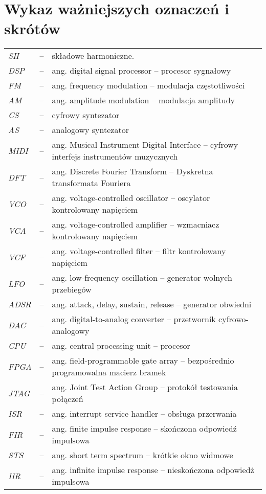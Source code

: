 \chapter*{Wykaz ważniejszych oznaczeń i skrótów}

\begin{tabular}{lcl}
	\textit{SH} & -- & składowe harmoniczne. \\
	\textit{DSP} & -- & ang. digital signal processor -- procesor sygnałowy \\
	\textit{FM} & -- & ang. frequency modulation -- modulacja częstotliwości \\
	\textit{AM} & -- & ang. amplitude modulation -- modulacja amplitudy \\
	\textit{CS} & -- & cyfrowy syntezator \\
	\textit{AS} & -- & analogowy syntezator \\
	\textit{MIDI} & -- & ang. Musical Instrument Digital Interface -- cyfrowy interfejs instrumentów muzycznych \\
	\textit{DFT} & -- & ang. Discrete Fourier Transform -- Dyskretna transformata Fouriera \\
	\textit{VCO} & -- & ang. voltage-controlled oscillator -- oscylator kontrolowany napięciem \\
	\textit{VCA} & -- & ang. voltage-controlled amplifier -- wzmacniacz kontrolowany napięciem \\
	\textit{VCF} & -- & ang. voltage-controlled filter -- filtr kontrolowany napięciem \\
	\textit{LFO} & -- & ang. low-frequency oscillation -- generator wolnych przebiegów \\
	\textit{ADSR} & -- & ang. attack, delay, sustain, release -- generator obwiedni \\
	\textit{DAC} & -- & ang. digital-to-analog converter -- przetwornik cyfrowo-analogowy \\
	\textit{CPU} & -- & ang. central processing unit -- procesor \\
	\textit{FPGA} & -- & ang. field-programmable gate array -- bezpośrednio programowalna macierz bramek \\
	\textit{JTAG} & -- & ang. Joint Test Action Group -- protokół testowania połączeń \\
	\textit{ISR} & -- & ang. interrupt service handler -- obsługa przerwania \\
	\textit{FIR} & -- & ang. finite impulse response -- skończona odpowiedź impulsowa \\
	\textit{STS} & -- & ang. short term spectrum -- krótkie okno widmowe \\
	\textit{IIR} & -- & ang. infinite impulse response -- nieskończona odpowiedź impulsowa \\
\end{tabular} 
